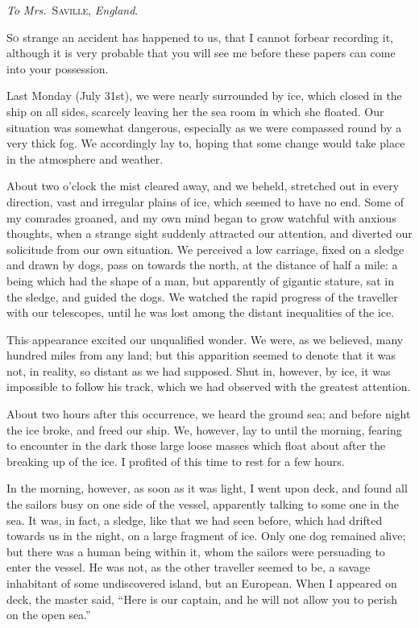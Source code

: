 
\emph{To Mrs.}~\textsc{Saville}, \emph{England}.


\noindent\textsc{So} strange an accident has happened
to us, that I cannot forbear recording
it, although it is very probable that
you will see me before these papers
can come into your possession.

Last Monday (July 31st), we were
nearly surrounded by ice, which closed
in the ship on all sides, scarcely leaving
her the sea room in which she
floated. Our situation was somewhat
dangerous, especially as we were compassed
round by a very thick fog. We
accordingly lay to, hoping that some
change would take place in the atmosphere
and weather.

About two o'clock the mist cleared
away, and we beheld, stretched out in
every direction, vast and irregular
plains of ice, which seemed to have no
end. Some of my comrades groaned,
and my own mind began to grow
watchful with anxious thoughts, when
a strange sight suddenly attracted our
attention, and diverted our solicitude
from our own situation. We perceived
a low carriage, fixed on a sledge and
drawn by dogs, pass on towards the
north, at the distance of half a mile:
a being which had the shape of a
man, but apparently of gigantic stature,
sat in the sledge, and guided
the dogs. We watched the rapid progress
of the traveller with our telescopes,
until he was lost among the
distant inequalities of the ice.

This appearance excited our unqualified
wonder. We were, as we believed,
many hundred miles from any
land; but this apparition seemed to
denote that it was not, in reality, so
distant as we had supposed. Shut
in, however, by ice, it was impossible
to follow his track, which we
had observed with the greatest attention.

About two hours after this occurrence,
we heard the ground sea; and
before night the ice broke, and freed
our ship. We, however, lay to until
the morning, fearing to encounter in
the dark those large loose masses
which float about after the breaking up
of the ice. I profited of this time to
rest for a few hours.

In the morning, however, as soon
as it was light, I went upon deck, and
found all the sailors busy on one side
of the vessel, apparently talking to
some one in the sea. It was, in fact, a
sledge, like that we had seen before,
which had drifted towards us in the
night, on a large fragment of ice.
Only one dog remained alive; but
there was a human being within it,
whom the sailors were persuading to
enter the vessel. He was not, as the
other traveller seemed to be, a savage
inhabitant of some undiscovered island,
but an European. When I appeared
on deck, the master said, ``Here is our
captain, and he will not allow you to
perish on the open sea.''

